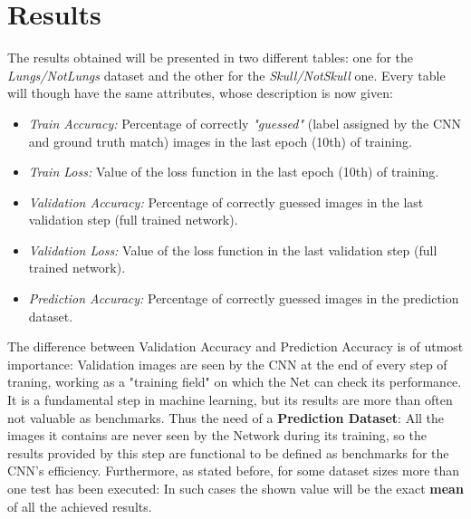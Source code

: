 \documentclass[../main.tex]{subfiles}
\begin{document}
\section{Results}
The results obtained will be presented in two different tables: one for the \textit{Lungs/NotLungs} dataset and the other for the \textit{Skull/NotSkull} one. Every table will though have the same attributes, whose description is now given:

\begin{itemize}
	\item \textit{Train Accuracy:} Percentage of correctly \textit{"guessed"} (label assigned by the CNN and ground truth match) images in the last epoch (10th) of training.
	\item \textit{Train Loss:} Value of the loss function in the last epoch (10th) of training.
	\item \textit{Validation Accuracy:} Percentage of correctly guessed images in the last validation step (full trained network).
	\item \textit{Validation Loss:} Value of the loss function in the last validation step (full trained network).
	\item \textit{Prediction Accuracy:} Percentage of correctly guessed images in the prediction dataset.
\end{itemize}

The difference between Validation Accuracy and Prediction Accuracy is of utmost importance: Validation images are seen by the CNN at the end of every step of traning, working as a "training field" on which the Net can check its performance. It is a fundamental step in machine learning, but its results are more than often not valuable as benchmarks. Thus the need of a \textbf{Prediction Dataset}: All the images it contains are never seen by the Network during its training, so the results provided by this step are functional to be defined as benchmarks for the CNN's efficiency. Furthermore, as stated before, for some dataset sizes more than one test has been executed: In such cases the shown value will be the exact \textbf{mean} of all the achieved results.
\end{document}
